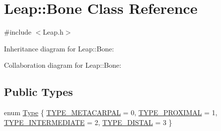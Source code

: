 \hypertarget{class_leap_1_1_bone}{}\section{Leap\+:\+:Bone Class Reference}
\label{class_leap_1_1_bone}


{\ttfamily \#include $<$Leap.\+h$>$}



Inheritance diagram for Leap\+:\+:Bone\+:


Collaboration diagram for Leap\+:\+:Bone\+:
\subsection*{Public Types}
\begin{DoxyCompactItemize}
\item 
enum \hyperlink{class_leap_1_1_bone_ac2f949e05b22edc21a308df42580b5e1}{Type} \{ \hyperlink{class_leap_1_1_bone_ac2f949e05b22edc21a308df42580b5e1a64438d8f76c83b77f96cbe6d7a18af6a}{T\+Y\+P\+E\+\_\+\+M\+E\+T\+A\+C\+A\+R\+P\+AL} = 0, 
\hyperlink{class_leap_1_1_bone_ac2f949e05b22edc21a308df42580b5e1a83869c024e17895c58bfbb23c8f4058b}{T\+Y\+P\+E\+\_\+\+P\+R\+O\+X\+I\+M\+AL} = 1, 
\hyperlink{class_leap_1_1_bone_ac2f949e05b22edc21a308df42580b5e1a4295c9df146b92098c857833030cd6d2}{T\+Y\+P\+E\+\_\+\+I\+N\+T\+E\+R\+M\+E\+D\+I\+A\+TE} = 2, 
\hyperlink{class_leap_1_1_bone_ac2f949e05b22edc21a308df42580b5e1a0f3eb18922a8269e2e1c6ebb4c757125}{T\+Y\+P\+E\+\_\+\+D\+I\+S\+T\+AL} = 3
 \}
\end{DoxyCompactItemize}
